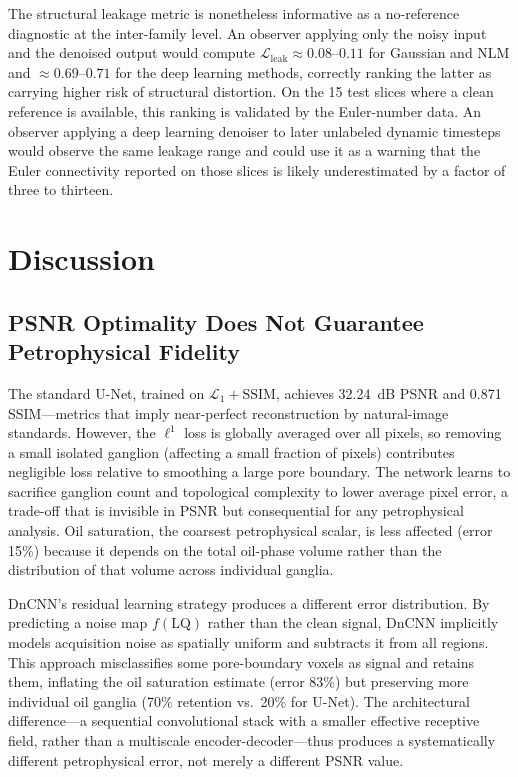 \documentclass[review,12pt]{elsarticle}
\begin{document}
The structural leakage metric is nonetheless informative as a
no-reference diagnostic at the inter-family level.  An observer applying
only the noisy input and the denoised output would compute
$\mathcal{L}_{\mathrm{leak}} \approx 0.08$--$0.11$ for Gaussian and
NLM and $\approx 0.69$--$0.71$ for the deep learning methods, correctly
ranking the latter as carrying higher risk of structural distortion.  On
the 15 test slices where a clean reference is available, this ranking is
validated by the Euler-number data.  An observer applying a deep
learning denoiser to later unlabeled dynamic timesteps would observe the
same leakage range and could use it as a warning that the Euler
connectivity reported on those slices is likely underestimated by a
factor of three to thirteen.

\section{Discussion}
\label{sec:discussion}

\subsection{PSNR Optimality Does Not Guarantee Petrophysical Fidelity}
\label{sec:discussion:psnr}

The standard U-Net, trained on $\mathcal{L}_1 + \mathrm{SSIM}$,
achieves 32.24~dB PSNR and 0.871 SSIM---metrics that imply
near-perfect reconstruction by natural-image standards.  However,
the $\ell^1$ loss is globally averaged over all pixels, so removing a
small isolated ganglion (affecting a small fraction of pixels)
contributes negligible loss relative to smoothing a large pore
boundary.  The network learns to sacrifice ganglion count and
topological complexity to lower average pixel error, a trade-off that
is invisible in PSNR but consequential for any petrophysical analysis.
Oil saturation, the coarsest petrophysical scalar, is less affected
(error 15\%) because it depends on the total oil-phase volume rather
than the distribution of that volume across individual ganglia.

DnCNN's residual learning strategy produces a different error
distribution.  By predicting a noise map $f(\mathrm{LQ})$ rather than
the clean signal, DnCNN implicitly models acquisition noise as spatially
uniform and subtracts it from all regions.  This approach misclassifies
some pore-boundary voxels as signal and retains them, inflating the oil
saturation estimate (error 83\%) but preserving more individual oil
ganglia (70\% retention vs.\ 20\% for U-Net).  The architectural
difference---a sequential convolutional stack with a smaller effective
receptive field, rather than a multiscale encoder-decoder---thus
produces a systematically different petrophysical error, not merely a
different PSNR value.
\end{document}

